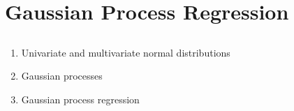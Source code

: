 \section[Gaussian Process regression]{Gaussian Process Regression}
\subsection{}
\begin{frame}{}
\vspace{0.75cm}
\vspace{0.5cm}
\begin{enumerate}
    \item Univariate and multivariate normal distributions
    \item Gaussian processes
    \item Gaussian process regression
\end{enumerate}
\end{frame}


